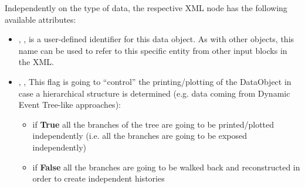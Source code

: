 Independently on the type of data, the respective XML node has the following
available attributes:
\vspace{-5mm}
\begin{itemize}
  \itemsep0em
  \item {}, , is a user-defined
  identifier for this data object.
  \nb As with other objects, this name can be used to refer to this specific
  entity from other input blocks in the XML.

  \item {}, , 
  This flag is going to ``control'' the printing/plotting of the DataObject in 
  case a hierarchical structure is determined (e.g.
  data coming from Dynamic Event Tree-like approaches):
  \begin{itemize}
    \item if \textbf{True} all the branches of the tree are going to be printed/plotted independently 
               (i.e. all the branches are going to be exposed independently)
    \item if \textbf{False} all the branches are going to be walked back and reconstructed in order to create independent histories
  \end{itemize}
\end{itemize}
